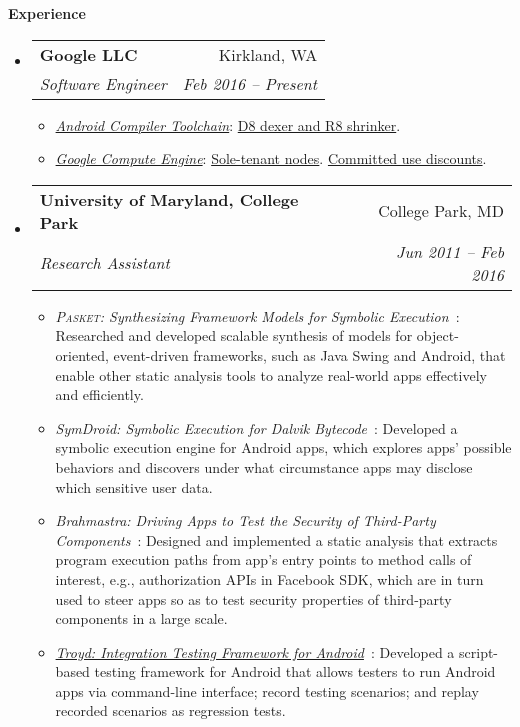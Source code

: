 \documentclass[letterpaper,11pt]{article}
\makeatletter
\newcommand{\resheading}[1]{{\large \colorbox{mygrey}{\begin{minipage}{\textwidth}{\textbf{#1 \vphantom{p\^{E}}}}\end{minipage}}}}
\newcommand{\ressubheading}[4]{
\begin{tabular*}{6.5in}{l@{\extracolsep{\fill}}r}
    \textbf{#1} & #2 \\
    \textit{#3} & \textit{#4} \\
\end{tabular*}\vspace{-6pt}}
\makeatother
\begin{document}
\resheading{Experience}
  \begin{itemize}
    \item
      \ressubheading{{Google LLC}}{Kirkland, WA}{Software Engineer}{Feb 2016 -- Present}
        {
\small
        \begin{itemize}
\item\emph{\href{https://developer.android.com/studio/preview/index.html}{Android Compiler Toolchain}}:
\href{https://r8.googlesource.com/r8}{D8 dexer and R8 shrinker}.

\item\emph{\href{https://cloud.google.com/compute/}{Google Compute Engine}}:
\href{https://cloudplatform.googleblog.com/2018/06/Introducing-sole-tenant-nodes-for-Google-Compute-Engine.html}{Sole-tenant nodes}.
\href{https://cloudplatform.googleblog.com/2017/09/committed-use-discounts-for-Google-Compute-Engine-now-generally-available.html}{Committed use discounts}.
        \end{itemize}
        }
    \item
      \ressubheading{{University of Maryland, College Park}}{College Park, MD}{Research Assistant}{Jun 2011 -- Feb 2016}
        {
\small
        \begin{itemize}
\item\emph{\textsc{Pasket}: Synthesizing Framework Models for Symbolic Execution}~\cite{FMSD17, icse16, fse15, cav15, popl14, jsk-tr}:
Researched and developed scalable synthesis of models for object-oriented,
event-driven frameworks, such as Java Swing and Android,
that enable other static analysis tools
to analyze real-world apps effectively and efficiently.

\item\emph{SymDroid: Symbolic Execution for Dalvik Bytecode}~\cite{esorics15, esorics15-tr, symdroid}:
Developed a symbolic execution engine for Android apps,
which explores apps' possible behaviors and
discovers under what circumstance apps may disclose which sensitive user data.

\item\emph{Brahmastra: Driving Apps to Test the Security of Third-Party Components}~\cite{security14}:
Designed and implemented a static analysis that extracts program execution paths
from app's entry points to method calls of interest, e.g., authorization APIs
in Facebook SDK, which are in turn used to steer apps so as to test
security properties of third-party components in a large scale.

\item\emph{\href{https://github.com/plum-umd/troyd}{Troyd: Integration Testing Framework for Android}}~\cite{troyd}:
Developed a script-based testing framework for Android
that allows testers to run Android apps via command-line interface;
record testing scenarios; and replay recorded scenarios as regression tests.


\end{itemize}}
\end{itemize}
\end{document}
